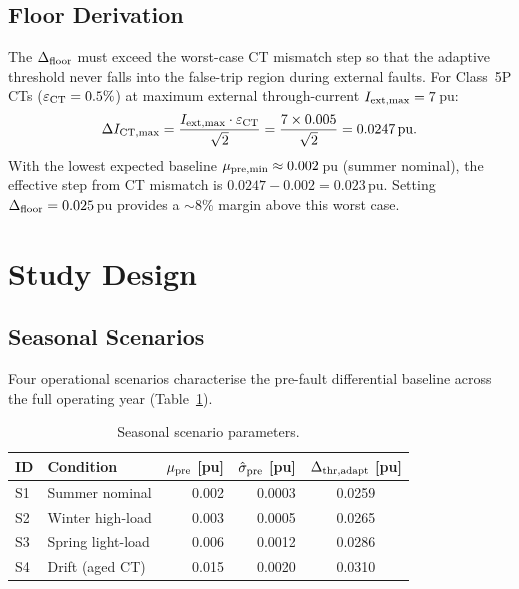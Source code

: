 \documentclass[11pt,a4paper]{article}
\begin{document}
\subsection{Floor Derivation}
\label{sec:floor_derivation}

The $\Delta_{\rm floor}$ must exceed the worst-case CT mismatch step so that
the adaptive threshold never falls into the false-trip region during external
faults.  For Class~5P CTs ($\varepsilon_{\rm CT} = 0.5\%$) at maximum
external through-current $I_{\rm ext,max} = 7$\,pu:
\begin{equation}
  \Delta I_{\rm CT,max} = \frac{I_{\rm ext,max}\cdot\varepsilon_{\rm CT}}{\sqrt{2}}
  = \frac{7\times0.005}{\sqrt{2}} = 0.0247\,\text{pu}.
\end{equation}
With the lowest expected baseline $\mu_{\rm pre,min} \approx 0.002$\,pu
(summer nominal), the effective step from CT mismatch is
$0.0247-0.002 = 0.023$\,pu.  Setting $\Delta_{\rm floor} = 0.025$\,pu
provides a $\sim$8\% margin above this worst case.

\section{Study Design}

\subsection{Seasonal Scenarios}

Four operational scenarios characterise the pre-fault differential
baseline across the full operating year (Table~\ref{tab:scenarios}).

\begin{table}[h!]
\centering
\caption{Seasonal scenario parameters.}
\label{tab:scenarios}
\begin{tabular}{llrrc}
\toprule
ID & Condition & $\mu_{\rm pre}$ [pu] & $\hat{\sigma}_{\rm pre}$ [pu]
   & $\Delta_{\rm thr,adapt}$ [pu] \\
\midrule
S1 & Summer nominal    & 0.002 & 0.0003 & 0.0259 \\
S2 & Winter high-load  & 0.003 & 0.0005 & 0.0265 \\
S3 & Spring light-load & 0.006 & 0.0012 & 0.0286 \\
S4 & Drift (aged CT)   & 0.015 & 0.0020 & 0.0310 \\
\bottomrule
\end{tabular}
\end{table}
\end{document}
